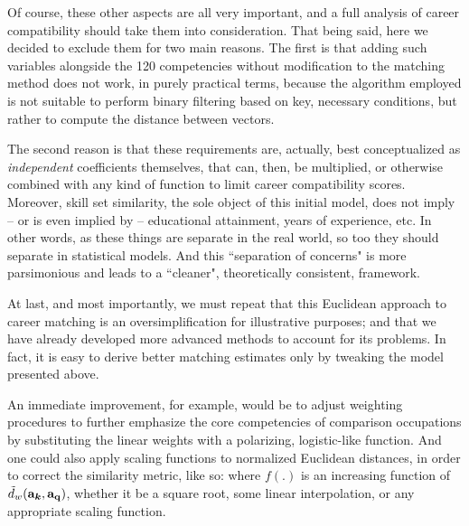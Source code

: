 \documentclass{article}
\begin{document}
Of course, these other aspects are all very important, and a full analysis of
career compatibility should take them into consideration. That being said, here
we decided to exclude them for two main reasons. The first is that adding such
variables alongside the 120 competencies without modification to the matching
method does not work, in purely practical terms, because the algorithm employed
is not suitable to perform binary filtering based on key, necessary conditions,
but rather to compute the distance between vectors.

The second reason is that these requirements are, actually, best conceptualized
as \textit{independent} coefficients themselves, that can, then, be multiplied,
or otherwise combined with any kind of function to limit career compatibility
scores. Moreover, skill set similarity, the sole object of this initial model,
does not imply -- or is even implied by -- educational attainment, years of
experience, etc. In other words, as these things are separate in the real
world, so too they should separate in statistical models. And this ``separation
of concerns" is more parsimonious and leads to a ``cleaner", theoretically
consistent, framework.

At last, and most importantly, we must repeat that this Euclidean approach to
career matching is an oversimplification for illustrative purposes; and that we
have already developed more advanced methods to account for its problems. In
fact, it is easy to derive better matching estimates only by tweaking the model
presented above.

An immediate improvement, for example, would be to adjust weighting procedures
to further emphasize the core competencies of comparison occupations by
substituting the linear weights with a polarizing, logistic-like function. And
one could also apply scaling functions to normalized Euclidean distances, in
order to correct the similarity metric, like so: \SimilarityScaling where
$f(.)$ is an increasing function of $\tilde{d}_w(\vb{a_{\boldsymbol{k}}},
    \vb{a_{q}})$, whether it be a square root, some linear interpolation, or any
appropriate scaling function.
\end{document}
